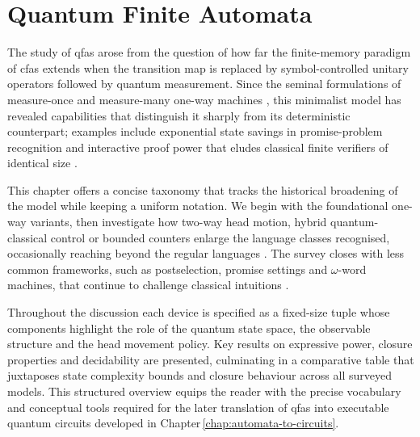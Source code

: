 \chapter{Quantum Finite Automata}
\label{chap:quantum-finite-automata}

The study of \glspl{qfa} arose from the question of how far the
finite-memory paradigm of \glspl{cfa} extends when the transition
map is replaced by symbol-controlled unitary operators followed by
quantum measurement. Since the seminal formulations of measure-once and
measure-many one-way machines \cite{kondacs1997power,
moore2000quantum}, this minimalist model has revealed capabilities
that distinguish it sharply from its deterministic counterpart; examples
include exponential state savings in promise-problem recognition
\cite{ambainis19981} and interactive proof power that eludes
classical finite verifiers of identical size \cite{nishimura2009application}.

This chapter offers a concise taxonomy that tracks the historical
broadening of the model while keeping a uniform notation. We begin with
the foundational one-way variants, then investigate how two-way head
motion, hybrid quantum-classical control or bounded counters enlarge the
language classes recognised, occasionally reaching beyond the regular
languages \cite{brodsky2002characterizations,ambainis2002two,zheng2012one}. The survey closes with less common
frameworks, such as postselection, promise settings and $\omega$-word machines, 
that continue to challenge classical intuitions
\cite{aaronson2005quantum,scegulnaja2010postselection,bhatia2019quantum}.

Throughout the discussion each device is specified as a fixed-size tuple
whose components highlight the role of the quantum state space, the
observable structure and the head movement policy. Key results on
expressive power, closure properties and decidability are presented, culminating in a comparative
table that juxtaposes state complexity bounds and closure behaviour
across all surveyed models. This structured overview equips the reader
with the precise vocabulary and conceptual tools required for the later
translation of \glspl{qfa} into executable quantum circuits developed in
Chapter\,\ref{chap:automata-to-circuits}.



